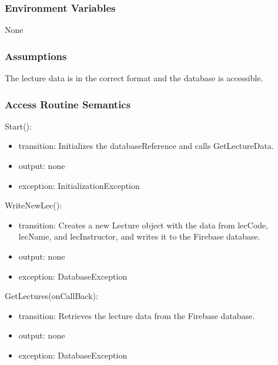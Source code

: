 \documentclass[12pt, titlepage]{article}
\begin{document}
\subsubsection{Environment Variables}

None

\subsubsection{Assumptions}

The lecture data is in the correct format and the database is accessible.

\subsubsection{Access Routine Semantics}

\noindent Start():
\begin{itemize}
\item transition: Initializes the databaseReference and calls GetLectureData.
\item output: none
\item exception: InitializationException
\end{itemize}

\noindent WriteNewLec():
\begin{itemize}
\item transition: Creates a new Lecture object with the data from lecCode, lecName, and lecInstructor, and writes it to the Firebase database.
\item output: none
\item exception: DatabaseException
\end{itemize}

\noindent GetLectures(onCallBack):
\begin{itemize}
\item transition: Retrieves the lecture data from the Firebase database.
\item output: none
\item exception: DatabaseException
\end{itemize}
\end{document}

